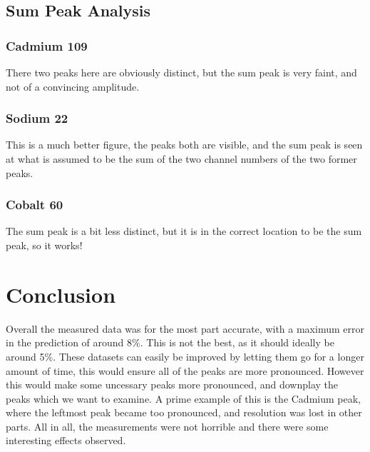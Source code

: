\documentclass[letterpaper,12pt]{article}
\begin{document}
\subsection{Sum Peak Analysis}
\subsubsection{Cadmium 109}
There two peaks here are obviously distinct, but the sum peak is very faint, and not of a convincing amplitude.

\subsubsection{Sodium 22}
This is a much better figure, the peaks both are visible, and the sum peak is seen at what is assumed to be the sum of the two channel numbers of the two former peaks. 

\subsubsection{Cobalt 60}
The sum peak is a bit less distinct, but it is in the correct location to be the sum peak, so it works!

\section{Conclusion}
Overall the measured data was for the most part accurate, with a maximum error in the prediction of around 8\%. This is not the best, as it should ideally be around 5\%. These datasets can easily be improved by letting them go for a longer amount of time, this would ensure all of the peaks are more pronounced. However this would make some uncessary peaks more pronounced, and downplay the peaks which we want to examine. A prime example of this is the Cadmium peak, where the leftmost peak became too pronounced, and resolution was lost in other parts. All in all, the measurements were not horrible and there were some interesting effects observed. 



\end{document}
